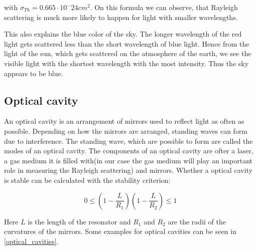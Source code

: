 \documentclass[12pt,a4paper]{article}
\begin{document}
with $\sigma_{Th} = 0.665 \cdot 10^-24 cm^2$. On this formula we can observe, that Rayleigh scattering is much more likely to happen for light with smaller wavelengths.

This also explains the blue color of the sky. The longer wavelength of the red light gets scattered less than the short wavelength of blue light. Hence from the light of the sun, which gets scattered on the atmosphere of the earth, we see the visible light with the shortest wavelength with the most intensity. Thus the sky appears to be blue.

\subsection{Optical cavity}

An optical cavity is an arrangement of mirrors used to reflect light as often as possible. Depending on how the mirrors are arranged, standing waves can form due to interference. The standing wave, which are possible to form are called the modes of an optical cavity. The components of an optical cavity are ofter a laser, a gas medium it is filled with(in our case the gas medium will play an important role in measuring the Rayleigh scattering) and mirrors. Whether a optical cavity is stable can be calculated with the stability criterion:

\begin{equation}
	0 \leq (1 -  \frac{L}{R_1})(1- \frac{L}{R_2}) \leq 1
\end{equation}

Here $L$ is the length of the resonator and $R_1$ and $R_2$ are the radii of the curvatures of the mirrors. Some examples for optical cavities can be seen in \ref{optical_cavities}.
\end{document}
